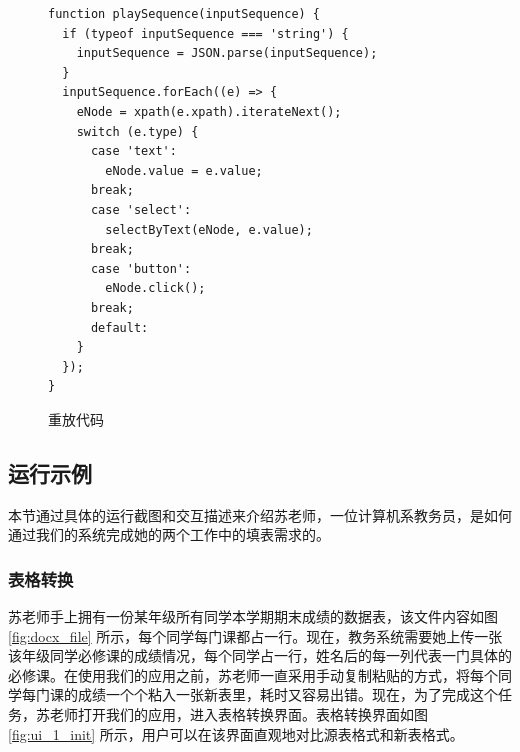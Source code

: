 \documentclass[design, pageheader]{njubachelor}
\begin{document}
\begin{figure}
\begin{lstlisting}[style=htmlcssjs]
function playSequence(inputSequence) {
  if (typeof inputSequence === 'string') {
    inputSequence = JSON.parse(inputSequence);
  }
  inputSequence.forEach((e) => {
    eNode = xpath(e.xpath).iterateNext();
    switch (e.type) {
      case 'text':
        eNode.value = e.value;
      break;
      case 'select':
        selectByText(eNode, e.value);
      break;
      case 'button':
        eNode.click();
      break;
      default:
    }
  });
}
\end{lstlisting}
    \caption{重放代码}
    \label{fig:replay}
\end{figure}

\subsection{运行示例}
本节通过具体的运行截图和交互描述来介绍苏老师，一位计算机系教务员，是如何通过我们的系统完成她的两个工作中的填表需求的。
\subsubsection{表格转换}
苏老师手上拥有一份某年级所有同学本学期期末成绩的数据表，该文件内容如图 \ref{fig:docx_file} 所示，每个同学每门课都占一行。现在，教务系统需要她上传一张该年级同学必修课的成绩情况，每个同学占一行，姓名后的每一列代表一门具体的必修课。在使用我们的应用之前，苏老师一直采用手动复制粘贴的方式，将每个同学每门课的成绩一个个粘入一张新表里，耗时又容易出错。现在，为了完成这个任务，苏老师打开我们的应用，进入表格转换界面。表格转换界面如图 \ref{fig:ui_1_init} 所示，用户可以在该界面直观地对比源表格式和新表格式。
\end{document}
